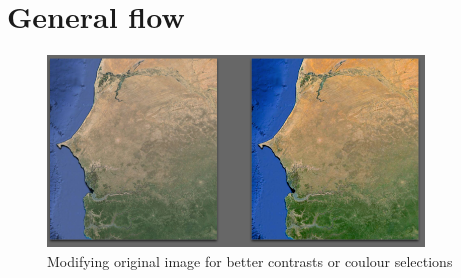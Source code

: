 \section{General flow}

\begin{figure}[hbtp]
\begin{center} 
\includegraphics[width=10cm]{SenegalSideBySide.png}
\caption{Modifying original image for better contrasts or coulour selections}
\label{fig:sideBySide}
\end{center}
\end{figure}
  
